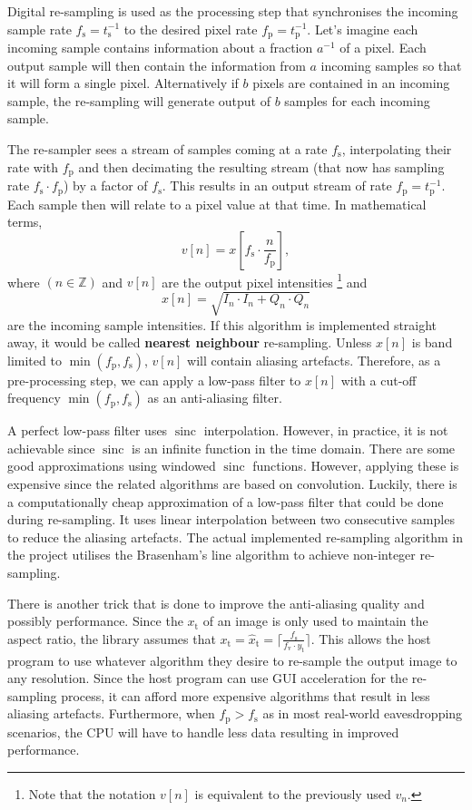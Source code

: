 \documentclass[a4paper,12pt,twoside,openright]{report}
\begin{document}
Digital re-sampling is used as the processing step that synchronises the incoming sample rate $f_\text{s} = t_\text{s}^{-1}$ to the desired pixel rate $f_\text{p} = t_\text{p}^{-1}$. Let's imagine each incoming sample contains information about a fraction $a^{-1}$ of a pixel. Each output sample will then contain the information from $a$ incoming samples so that it will form a single pixel. Alternatively if $b$ pixels are contained in an incoming sample, the re-sampling will generate output of $b$ samples for each incoming sample.

The re-sampler sees a stream of samples coming at a rate $f_\text{s}$, interpolating their rate with $f_\text{p}$ and then decimating the resulting stream (that now has sampling rate $f_\text{s} \cdot f_\text{p} $) by a factor of $f_\text{s}$. This results in an output stream of rate $f_\text{p} = t_\text{p}^{-1}$. Each sample then will relate to a pixel value at that time. In mathematical terms,
$$ v[n] = x\left[f_\text{s} \cdot \frac{n}{f_\text{p}} \right],$$
where $(n \in \mathbb{Z})$ and  $v[n]$ are the output pixel intensities \footnote{Note that the notation $v[n]$ is equivalent to the previously used $v_{n}$.} and 
$$x[n] = \sqrt{I_{n} \cdot I_{n} + Q_{n} \cdot Q_{n}}$$
are the incoming sample intensities. If this algorithm is implemented straight away, it would be called \textbf{nearest neighbour} re-sampling. Unless $x[n]$ is band limited to $\min (f_\text{p}, f_\text{s})$, $v[n]$ will contain aliasing artefacts. Therefore, as a pre-processing step, we can apply a low-pass filter to $x[n]$ with a cut-off frequency $\min (f_\text{p}, f_\text{s})$ as an anti-aliasing filter.

A perfect low-pass filter uses $\operatorname{sinc}$ interpolation. However, in practice, it is not achievable since $\operatorname{sinc}$ is an infinite function in the time domain. There are some good approximations using windowed $\operatorname{sinc}$ functions. However, applying these is expensive since the related algorithms are based on convolution. Luckily, there is a computationally cheap approximation of a low-pass filter that could be done during re-sampling. It uses linear interpolation between two consecutive samples to reduce the aliasing artefacts. The actual implemented re-sampling algorithm in the project utilises the Brasenham's line algorithm\cite{bresenham1965algorithm} to achieve non-integer re-sampling.

There is another trick that is done to improve the anti-aliasing quality and possibly performance. Since the $x_\text{t}$ of an image is only used to maintain the aspect ratio, the library assumes that $x_\text{t} = \hat{x}_\text{t} = \lceil \frac{f_\text{s}}{f_\text{v} \cdot y_\text{t}} \rceil$. This allows the host program to use whatever algorithm they desire to re-sample the output image to any resolution. Since the host program can use GUI acceleration for the re-sampling process, it can afford more expensive algorithms that result in less aliasing artefacts. Furthermore, when $f_\text{p} > f_\text{s}$ as in most real-world eavesdropping scenarios, the CPU will have to handle less data resulting in improved performance.
\end{document}
